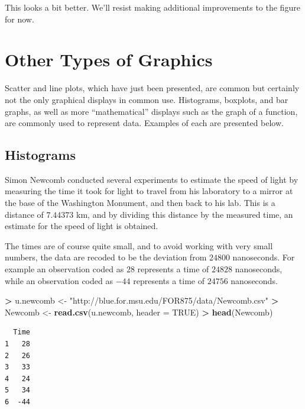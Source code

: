 \documentclass[]{krantz}
\makeatletter
\newenvironment{Shaded}{\begin{snugshade}}{\end{snugshade}}
\newcommand{\DataTypeTok}[1]{\textcolor[rgb]{0.27,0.27,0.27}{#1}}
\newcommand{\KeywordTok}[1]{\textcolor[rgb]{0.27,0.27,0.27}{\textbf{#1}}}
\newcommand{\NormalTok}[1]{#1}
\newcommand{\OperatorTok}[1]{\textcolor[rgb]{0.43,0.43,0.43}{\textbf{#1}}}
\newcommand{\OtherTok}[1]{\textcolor[rgb]{0.37,0.37,0.37}{#1}}
\newcommand{\StringTok}[1]{\textcolor[rgb]{0.5,0.5,0.5}{#1}}
\newenvironment{kframe}{%
\medskip{}
\setlength{\fboxsep}{.8em}
 \def\at@end@of@kframe{}%
 \ifinner\ifhmode%
  \def\at@end@of@kframe{\end{minipage}}%
  \begin{minipage}{\columnwidth}%
 \fi\fi%
 \def\FrameCommand##1{\hskip\@totalleftmargin \hskip-\fboxsep
 \colorbox{shadecolor}{##1}\hskip-\fboxsep
     \hskip-\linewidth \hskip-\@totalleftmargin \hskip\columnwidth}%
 \MakeFramed {\advance\hsize-\width
   \@totalleftmargin\z@ \linewidth\hsize
   \@setminipage}}%
 {\par\unskip\endMakeFramed%
 \at@end@of@kframe}
\renewenvironment{Shaded}{\begin{kframe}}{\end{kframe}}
\makeatother
\begin{document}
This looks a bit better. We'll resist making additional improvements to the figure for now.

\hypertarget{other-types-of-graphics}{%
\section{Other Types of Graphics}\label{other-types-of-graphics}}

Scatter and line plots, which have just been presented, are common but certainly not the only graphical displays in common use. Histograms, boxplots, and bar graphs, as well as more ``mathematical'' displays such as the graph of a function, are commonly used to represent data. Examples of each are presented below.

\hypertarget{histograms}{%
\subsection{Histograms}\label{histograms}}

Simon Newcomb conducted several experiments to estimate the speed of light by measuring the time it took for light to travel from his laboratory to a mirror at the base of the Washington Monument, and then back to his lab. This is a distance of \(7.44373\) km, and by dividing this distance by the measured time, an estimate for the speed of light is obtained.

The times are of course quite small, and to avoid working with very small numbers, the data are recoded to be the deviation from \(24800\) nanoseconds. For example an observation coded as \(28\) represents a time of \(24828\) nanoseconds, while an observation coded as \(-44\) represents a time of \(24756\) nanoseconds.

\begin{Shaded}
\begin{Highlighting}[]
\OperatorTok{>}\StringTok{ }\NormalTok{u.newcomb <-}\StringTok{ "http://blue.for.msu.edu/FOR875/data/Newcomb.csv"}
\OperatorTok{>}\StringTok{ }\NormalTok{Newcomb <-}\StringTok{ }\KeywordTok{read.csv}\NormalTok{(u.newcomb, }\DataTypeTok{header =} \OtherTok{TRUE}\NormalTok{)}
\OperatorTok{>}\StringTok{ }\KeywordTok{head}\NormalTok{(Newcomb)}
\end{Highlighting}
\end{Shaded}

\begin{verbatim}
  Time
1   28
2   26
3   33
4   24
5   34
6  -44
\end{verbatim}
\end{document}
